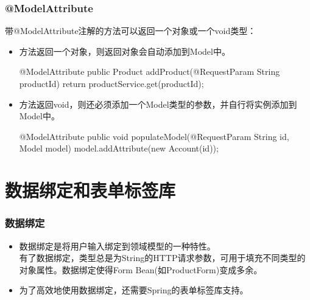 \documentclass[hyperref={pdfpagelabels=false},compress,table]{beamer} %
\newcommand{\hei}{\CJKfamily{SimHei}}
\def\Red{\color{red}}
\begin{document}
\begin{frame}[fragile]
  \frametitle{@ModelAttribute}

  带@ModelAttribute注解的方法可以返回一个对象或一个void类型：

  \begin{itemize}
  \item 方法返回一个对象，则返回对象会自动添加到Model中。
    \begin{javaCode}
      @ModelAttribute
      public Product addProduct(@RequestParam String productId) {
        return productService.get(productId);
      }      
    \end{javaCode}
  \item 方法返回void，则还必须添加一个Model类型的参数，并自行将实例添加到Model中。
    \begin{javaCode}
      @ModelAttribute
      public void populateModel(@RequestParam String id, Model model) {
        model.addAttribute(new Account(id));
      }
    \end{javaCode}
  \end{itemize}
\end{frame}

\section{数据绑定和表单标签库}

\begin{frame}[fragile]
  \frametitle{数据绑定}

  \begin{itemize}
  \item {\Red\hei 数据绑定是将用户输入绑定到领域模型的一种特性。}\\
    有了数据绑定，类型总是为String的HTTP请求参数，可用于填充不同类型的
    对象属性。数据绑定使得Form Bean(如ProductForm)变成多余。
  \item 为了高效地使用数据绑定，还需要Spring的表单标签库支持。
  \end{itemize}
\end{frame}
\end{document}
